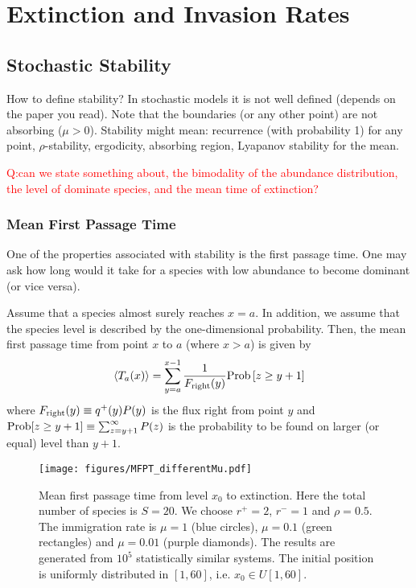 \documentclass[%
 amsmath,amssymb,
 reprint,%
]{revtex4-2}
\begin{document}
\section{Extinction and Invasion Rates}

\subsection{Stochastic Stability}

How to define stability? In stochastic models it is not well defined (depends on the paper you read). Note that the boundaries (or any other point) are not absorbing ($\mu>0$). Stability might mean: recurrence (with probability 1) for any point, $\rho$-stability, ergodicity, absorbing region, Lyapanov stability for the mean.   

\textcolor{red}{Q:can we state something about, the bimodality of the abundance distribution,  the level of dominate species, and the mean time of extinction?  }

\subsubsection{Mean First Passage Time}
One of the properties associated with stability is the first passage time. One may ask how long would it take for a species with low abundance to become dominant (or vice versa). 

Assume that a species almost surely reaches $x=a$. In addition, we assume that the species level is described by the one-dimensional probability. Then, the mean first passage time from point $x$ to $a$ (where $x>a$) is given by 
\begin{equation}
   \langle T_a(x) \rangle =   \sum_{y=a}^{x-1}\frac{1}{F_{\rm right}(y)}{\rm Prob}\left[z\geq y+1\right] \label{eq:MFPT}
\end{equation}
where $F_{\rm right}(y)\equiv q^+(y)P(y)$ is the flux right from point $y$ and ${\rm Prob}[z\geq y+1]\equiv \sum_{z=y+1}^{\infty}P(z)$ is the probability to be found on larger (or equal) level than $y+1$.

\begin{figure}
    \centering
    \texttt{[image: figures/MFPT\_differentMu.pdf]}
    \caption{Mean first passage time from level $x_0$ to extinction. Here the total number of species is $S=20$. We choose $r^+=2$, $r^-=1$ and $\rho=0.5$. The immigration rate is $\mu=1$ (blue circles), $\mu=0.1$ (green rectangles) and $\mu=0.01$ (purple diamonds). The results are generated from $10^5$ statistically similar systems. The initial position is uniformly distributed in $[1,60]$, i.e. $x_0\in U[1,60]$.      }
    \label{fig:MFPT_differentMu}
\end{figure}
\end{document}
